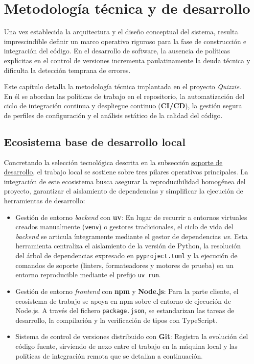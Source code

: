 \chapter{Metodología técnica y de desarrollo}\label{cap:metodologia_tecnica}

Una vez establecida la arquitectura y el diseño conceptual del sistema, resulta imprescindible definir un marco operativo riguroso para la fase de construcción e integración del código. En el desarrollo de software, la ausencia de políticas explícitas en el control de versiones incrementa paulatinamente la deuda técnica y dificulta la detección temprana de errores.

Este capítulo detalla la metodología técnica implantada en el proyecto \textit{Quizzie}. En él se abordan las políticas de trabajo en el repositorio, la automatización del ciclo de integración continua y despliegue continuo (\textbf{CI/CD}), la gestión segura de perfiles de configuración y el análisis estático de la calidad del código.

\section{Ecosistema base de desarrollo local}\label{sec:ecosistema_base}

Concretando la selección tecnológica descrita en la subsección \hyperref[subsec:soporte_desarrollo]{soporte de desarrollo}, el trabajo local se sostiene sobre tres pilares operativos principales. La integración de este ecosistema busca asegurar la reproducibilidad homogénea del proyecto, garantizar el aislamiento de dependencias y simplificar la ejecución de herramientas de desarrollo:

\begin{itemize}
    \item Gestión de entorno \textit{backend} con \textbf{uv}: En lugar de recurrir a entornos virtuales creados manualmente (\texttt{venv}) o gestores tradicionales, el ciclo de vida del \textit{backend} se articula íntegramente mediante el gestor de dependencias \textit{uv}. Esta herramienta centraliza el aislamiento de la versión de Python, la resolución del árbol de dependencias expresado en \texttt{pyproject.toml} y la ejecución de comandos de soporte (linters, formateadores y motores de prueba) en un entorno reproducible mediante el prefijo \texttt{uv run}.
    \item Gestión de entorno \textit{frontend} con \textbf{npm} y \textbf{Node.js}: Para la parte cliente, el ecosistema de trabajo se apoya en npm sobre el entorno de ejecución de Node.js. A través del fichero \texttt{package.json}, se estandarizan las tareas de desarrollo, la compilación y la verificación de tipos con TypeScript.
    \item Sistema de control de versiones distribuido con \textbf{Git}: Registra la evolución del código fuente, sirviendo de nexo entre el trabajo en la máquina local y las políticas de integración remota que se detallan a continuación.
\end{itemize}

